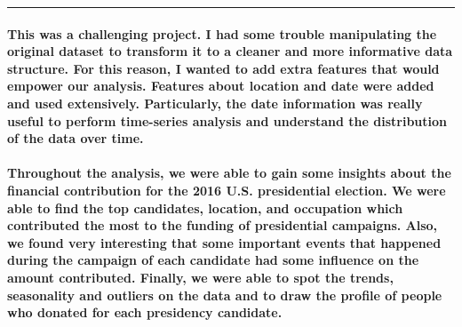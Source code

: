 \documentclass[]{article}
\let\oldparagraph\paragraph
\renewcommand{\paragraph}[1]{\oldparagraph{#1}\mbox{}}
\begin{document}
\begin{center}\rule{0.5\linewidth}{\linethickness}\end{center}

\paragraph{This was a challenging project. I had some trouble
manipulating the original dataset to transform it to a cleaner and more
informative data structure. For this reason, I wanted to add extra
features that would empower our analysis. Features about location and
date were added and used extensively. Particularly, the date information
was really useful to perform time-series analysis and understand the
distribution of the data over
time.}\label{this-was-a-challenging-project.-i-had-some-trouble-manipulating-the-original-dataset-to-transform-it-to-a-cleaner-and-more-informative-data-structure.-for-this-reason-i-wanted-to-add-extra-features-that-would-empower-our-analysis.-features-about-location-and-date-were-added-and-used-extensively.-particularly-the-date-information-was-really-useful-to-perform-time-series-analysis-and-understand-the-distribution-of-the-data-over-time.}

\paragraph{Throughout the analysis, we were able to gain some insights
about the financial contribution for the 2016 U.S. presidential
election. We were able to find the top candidates, location, and
occupation which contributed the most to the funding of presidential
campaigns. Also, we found very interesting that some important events
that happened during the campaign of each candidate had some influence
on the amount contributed. Finally, we were able to spot the trends,
seasonality and outliers on the data and to draw the profile of people
who donated for each presidency
candidate.}\label{throughout-the-analysis-we-were-able-to-gain-some-insights-about-the-financial-contribution-for-the-2016-u.s.-presidential-election.-we-were-able-to-find-the-top-candidates-location-and-occupation-which-contributed-the-most-to-the-funding-of-presidential-campaigns.-also-we-found-very-interesting-that-some-important-events-that-happened-during-the-campaign-of-each-candidate-had-some-influence-on-the-amount-contributed.-finally-we-were-able-to-spot-the-trends-seasonality-and-outliers-on-the-data-and-to-draw-the-profile-of-people-who-donated-for-each-presidency-candidate.}
\end{document}
